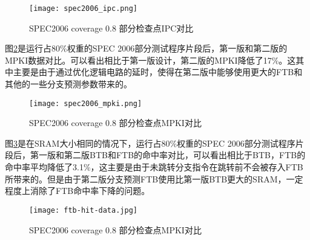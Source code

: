 
\begin{figure}[htb]
	\centering
	\setlength\tabcolsep{3pt}  %
	\vspace{5pt} %
	\texttt{[image: spec2006\_ipc.png]}
	\caption{SPEC2006 coverage 0.8 部分检查点IPC对比}
	\label{fig:figure61}
\end{figure}

图\ref{fig:figure62}是运行占80\%权重的SPEC 2006部分测试程序片段后，第一版和第二版的MPKI数据对比。可以看出相比于第一版设计，第二版的MPKI降低了17\%。这其中主要是由于通过优化逻辑电路的延时，使得在第二版中能够使用更大的FTB和其他的一些分支预测参数带来的。



\begin{figure}[htb]
	\centering
	\setlength\tabcolsep{3pt}  %
	\vspace{5pt} %
	\texttt{[image: spec2006\_mpki.png]}
	\caption{SPEC2006 coverage 0.8 部分检查点MPKI对比}
	\label{fig:figure62}
\end{figure}

图\ref{fig:figure63}是在SRAM大小相同的情况下，运行占80\%权重的SPEC 2006部分测试程序片段后，第一版和第二版BTB和FTB的命中率对比，可以看出相比于BTB，FTB的命中率平均降低了3.1\%，这主要是由于未跳转分支指令在跳转前不会被存入FTB所带来的。但是由于第二版分支预测FTB使用比第一版BTB更大的SRAM，一定程度上消除了FTB命中率下降的问题。



\begin{figure}[htb]
	\centering
	\setlength\tabcolsep{3pt}  %
	\vspace{5pt} %
	\texttt{[image: ftb-hit-data.jpg]}
	\caption{SPEC2006 coverage 0.8 部分检查点MPKI对比}
	\label{fig:figure63}
\end{figure}


